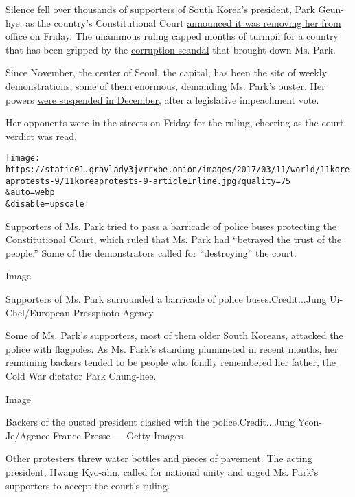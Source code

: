 Silence fell over thousands of supporters of South Korea's president,
Park Geun-hye, as the country's Constitutional Court
\href{https://www.nytimes3xbfgragh.onion/2017/03/09/world/asia/park-geun-hye-impeached-south-korea.html?hp\&action=click\&pgtype=Homepage\&clickSource=story-heading\&module=first-column-region\&region=top-news\&WT.nav=top-news}{announced
it was removing her from office} on Friday. The unanimous ruling capped
months of turmoil for a country that has been gripped by the
\href{https://www.nytimes3xbfgragh.onion/2016/12/09/world/asia/south-korea-president-park-geun-hye-impeached.html}{corruption
scandal} that brought down Ms. Park.

Since November, the center of Seoul, the capital, has been the site of
weekly demonstrations,
\href{https://www.nytimes3xbfgragh.onion/2016/11/26/world/asia/korea-park-geun-hye-protests.html}{some
of them enormous}, demanding Ms. Park's ouster. Her powers
\href{https://www.nytimes3xbfgragh.onion/2016/12/09/world/asia/south-korea-president-park-geun-hye-impeached.html}{were
suspended in December}, after a legislative impeachment vote.

Her opponents were in the streets on Friday for the ruling, cheering as
the court verdict was read.

\texttt{[image: https://static01.graylady3jvrrxbe.onion/images/2017/03/11/world/11koreaprotests-9/11koreaprotests-9-articleInline.jpg?quality=75\\\&auto=webp\\\&disable=upscale]}

Supporters of Ms. Park tried to pass a barricade of police buses
protecting the Constitutional Court, which ruled that Ms. Park had
``betrayed the trust of the people.'' Some of the demonstrators called
for ``destroying'' the court.

Image

Supporters of Ms. Park surrounded a barricade of police
buses.Credit...Jung Ui-Chel/European Pressphoto Agency

Some of Ms. Park's supporters, most of them older South Koreans,
attacked the police with flagpoles. As Ms. Park's standing plummeted in
recent months, her remaining backers tended to be people who fondly
remembered her father, the Cold War dictator Park Chung-hee.

Image

Backers of the ousted president clashed with the police.Credit...Jung
Yeon-Je/Agence France-Presse --- Getty Images

Other protesters threw water bottles and pieces of pavement. The acting
president, Hwang Kyo-ahn, called for national unity and urged Ms. Park's
supporters to accept the court's ruling.

